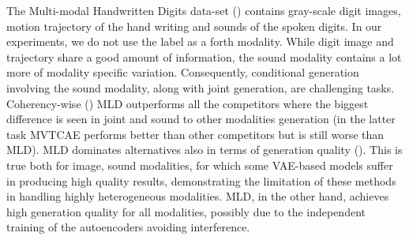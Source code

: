 The Multi-modal Handwritten Digits data-set (\textbf{\mhd}) \citep{Vasco2022} contains gray-scale digit images, motion trajectory of the hand writing and sounds of the spoken digits. In our experiments, we do not use the label as a forth modality. While digit image and trajectory share a good amount of information, the sound modality contains a lot more of modality specific variation. Consequently, conditional generation involving the sound modality, along with joint generation, are challenging tasks.
Coherency-wise () \gls{MLD} outperforms all the competitors where the biggest difference is seen in joint and sound to other modalities generation (in the latter task \gls{MVTCAE} performs better than other competitors but is still worse than \gls{MLD}). \gls{MLD} dominates alternatives also in terms of generation quality (). %
This is true both for image, sound modalities, for which some \gls{VAE}-based models suffer in producing high quality results, demonstrating the limitation of these methods in handling highly heterogeneous modalities. \gls{MLD}, in the other hand, achieves high generation quality for all modalities, possibly due to the independent training of the autoencoders avoiding interference.



